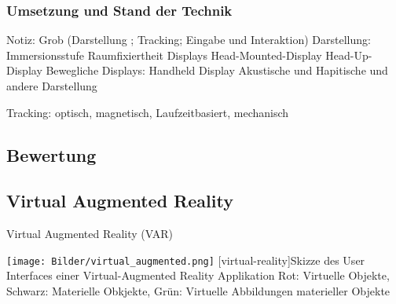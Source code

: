 \documentclass[12pt,a4paper,bibliography=totocnumbered,listof=totocnumbered]{scrartcl}
\begin{document}
\subsubsection{Umsetzung und Stand der Technik}
Notiz: Grob (Darstellung ; Tracking; Eingabe und Interaktion)
Darstellung:
Immersionsstufe
Raumfixiertheit
Displays
Head-Mounted-Display
Head-Up-Display
Bewegliche Displays: Handheld Display
Akustische und Hapitische und andere Darstellung

Tracking: optisch, magnetisch, Laufzeitbasiert, mechanisch
\subsection{Bewertung}
\subsection{Virtual Augmented Reality}
Virtual Augmented Reality (\ac{VAR})

\begin{minipage}{\linewidth}
\vspace{1em}
	\centering
	\texttt{[image: Bilder/virtual\_augmented.png]}
	[virtual-reality]{Skizze des User Interfaces einer Virtual-Augmented Reality Applikation\newline
	Rot: Virtuelle Objekte, Schwarz: Materielle Obkjekte, Grün: Virtuelle Abbildungen materieller Objekte}
	\label{fig:virtual_augmented_reality}
\vspace{1em}

\end{minipage}
\end{document}
